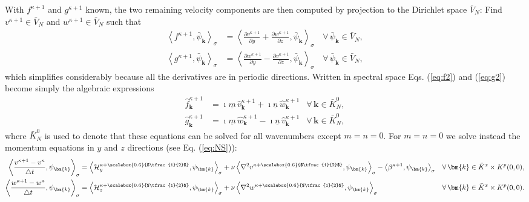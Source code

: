 \documentclass[preprint]{elsarticle}
\newcommand*{\Scale}[2][4]{\scalebox{#1}{$#2$}}%
\newcommand{\half}{\Scale[0.6]{\tfrac{1}{2}}}
\newcommand{\D}[1]{\bar{#1}}
\begin{document}
With ${f}^{\kappa+1}$ and ${g}^{\kappa+1}$ known, the two remaining velocity components are then computed by projection to the 
Dirichlet space $\D{V}_N$: Find 
${v}^{\kappa+1} \in \D{V}_N$ and $w^{\kappa+1} \in \D{V}_N$ such that
\begin{align}
\left<f^{\kappa+1}, \D{\psi}_{\bm{k}}\right>_{\sigma} &= \left<\frac{\partial v^{\kappa+1}}{\partial y} + 
\frac{\partial w^{\kappa+1}}{\partial z}, \D{\psi}_{\bm{k}}\right>_{\sigma} \, &\forall \, \D{\psi}_{\bm{k}} \in 
\D{V}_N, \label{eq:f2} \\
\left<g^{\kappa+1}, \D{\psi}_{\bm{k}}\right>_{\sigma} &= \left<\frac{\partial w^{\kappa+1}}{\partial y}  - 
\frac{\partial v^{\kappa+1}}{\partial z}, \D{\psi}_{\bm{k}}\right>_{\sigma} \, &\forall \, \D{\psi}_{\bm{k}} \in 
\D{V}_N, \label{eq:g2}
\end{align}
which simplifies considerably because all the derivatives are in periodic 
directions. Written in spectral space Eqs. (\ref{eq:f2}) and (\ref{eq:g2}) 
become simply the algebraic expressions
\begin{align}
\hat{f}_{\bm{k}}^{\kappa+1} &= \imath \underline{m}\, \hat{v}_{\bm{k}}^{\kappa+1} + \imath 
\underline{n}\, \hat{w}_{\bm{k}}^{\kappa+1} &\forall \, \bm{k} \in \D{K}_N^0, \label{eq:f3} \\
\hat{g}_{\bm{k}}^{\kappa+1} &= \imath \underline{m}\, \hat{w}_{\bm{k}}^{\kappa+1} - \imath 
\underline{n}\, \hat{v}_{\bm{k}}^{\kappa+1} & \forall \, \bm{k} \in \D{K}_N^0, \label{eq:g3}
\end{align}
where $\D{K}_N^0$ is used to denote that these equations can be solved for all 
wavenumbers except $m=n=0$. For $m=n=0$ we solve instead the momentum equations in $y$ and $z$ directions (see Eq. (\ref{eq:NS})):
\begin{align}
\left< \frac{v^{\kappa+1} - v^{\kappa}}{\triangle t}, \psi_{\bm{k}} \right>_{\sigma} &= \left< \mathcal{H}_{y}^{\kappa+\half}, \psi_{\bm{k}} \right>_{\sigma} + \nu \left< \nabla^2 v^{\kappa+\half},  \psi_{\bm{k}} \right>_{\sigma} -\left< \beta^{\kappa+1}, \psi_{\bm{k}} \right>_{\sigma} & \forall \, \bm{k} \in \D{K}^x \times K^p(0,0), \label{eq:v0} \\
\left< \frac{w^{\kappa+1} - w^{\kappa}}{\triangle t}, \psi_{\bm{k}} \right>_{\sigma} &= \left< \mathcal{H}_{z}^{\kappa+\half}, \psi_{\bm{k}} \right>_{\sigma} + \nu \left< \nabla^2 w^{\kappa+\half},  \psi_{\bm{k}} \right>_{\sigma}  & \forall \, \bm{k} \in \D{K}^x \times K^p(0,0) \label{eq:w0}.
\end{align}
\end{document}
